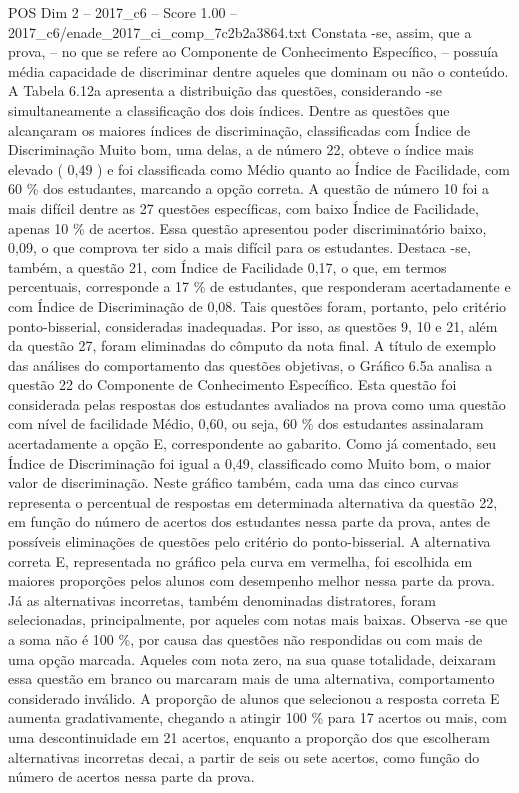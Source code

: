\begin{textsample}{POS Dim 2 – 2017\_c6 – Score 1.00 – 2017\_c6/enade\_2017\_ci\_comp\_7c2b2a3864.txt}
Constata -se, assim, que a prova, – no que se refere ao Componente de Conhecimento Específico, – possuía média capacidade de discriminar dentre aqueles que dominam ou não o conteúdo.
A Tabela 6.12a apresenta a distribuição das questões, considerando -se simultaneamente a classificação dos dois índices.
Dentre as questões que alcançaram os maiores índices de discriminação, classificadas com Índice de Discriminação Muito bom, uma delas, a de número 22, obteve o índice mais elevado ( 0,49 ) e foi classificada como Médio quanto ao Índice de Facilidade, com 60 \% dos estudantes, marcando a opção correta.
A questão de número 10 foi a mais difícil dentre as 27 questões específicas, com baixo Índice de Facilidade, apenas 10 \% de acertos.
Essa questão apresentou poder discriminatório baixo, 0,09, o que comprova ter sido a mais difícil para os estudantes.
Destaca -se, também, a questão 21, com Índice de Facilidade 0,17, o que, em termos percentuais, corresponde a 17 \% de estudantes, que responderam acertadamente e com Índice de Discriminação de 0,08.
Tais questões foram, portanto, pelo critério ponto-bisserial, consideradas inadequadas.
Por isso, as questões 9, 10 e 21, além da questão 27, foram eliminadas do cômputo da nota final.
A título de exemplo das análises do comportamento das questões objetivas, o Gráfico 6.5a analisa a questão 22 do Componente de Conhecimento Específico.
Esta questão foi considerada pelas respostas dos estudantes avaliados na prova como uma questão com nível de facilidade Médio, 0,60, ou seja, 60 \% dos estudantes assinalaram acertadamente a opção E, correspondente ao gabarito.
Como já comentado, seu Índice de Discriminação foi igual a 0,49, classificado como Muito bom, o maior valor de discriminação.
Neste gráfico também, cada uma das cinco curvas representa o percentual de respostas em determinada alternativa da questão 22, em função do número de acertos dos estudantes nessa parte da prova, antes de possíveis eliminações de questões pelo critério do ponto-bisserial.
A alternativa correta E, representada no gráfico pela curva em vermelha, foi escolhida em maiores proporções pelos alunos com desempenho melhor nessa parte da prova.
Já as alternativas incorretas, também denominadas distratores, foram selecionadas, principalmente, por aqueles com notas mais baixas.
Observa -se que a soma não é 100 \%, por causa das questões não respondidas ou com mais de uma opção marcada.
Aqueles com nota zero, na sua quase totalidade, deixaram essa questão em branco ou marcaram mais de uma alternativa, comportamento considerado inválido.
A proporção de alunos que selecionou a resposta correta E aumenta gradativamente, chegando a atingir 100 \% para 17 acertos ou mais, com uma descontinuidade em 21 acertos, enquanto a proporção dos que escolheram alternativas incorretas decai, a partir de seis ou sete acertos, como função do número de acertos nessa parte da prova.

\end{textsample}
